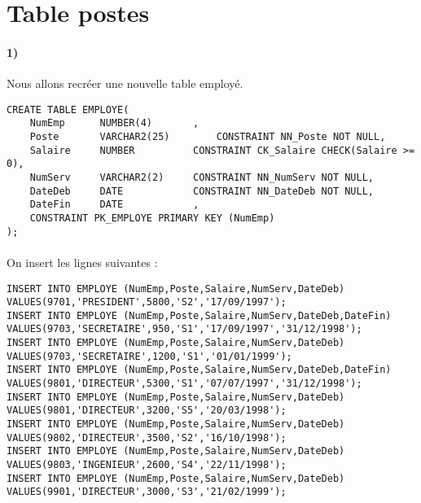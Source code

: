 \documentclass{report}
\begin{document}
\section{Table postes}

\paragraph{1)}Nous allons recréer une nouvelle table employé.

\begin{lstlisting}
CREATE TABLE EMPLOYE(
	NumEmp		NUMBER(4)		,
	Poste		VARCHAR2(25)		CONSTRAINT NN_Poste NOT NULL,
	Salaire		NUMBER			CONSTRAINT CK_Salaire CHECK(Salaire >= 0),
	NumServ		VARCHAR2(2)		CONSTRAINT NN_NumServ NOT NULL,
	DateDeb		DATE			CONSTRAINT NN_DateDeb NOT NULL,
	DateFin		DATE			,
	CONSTRAINT PK_EMPLOYE PRIMARY KEY (NumEmp)
);
\end{lstlisting}

\paragraph{}On insert les lignes suivantes :

\begin{lstlisting}
INSERT INTO EMPLOYE (NumEmp,Poste,Salaire,NumServ,DateDeb) VALUES(9701,'PRESIDENT',5800,'S2','17/09/1997');
INSERT INTO EMPLOYE (NumEmp,Poste,Salaire,NumServ,DateDeb,DateFin) VALUES(9703,'SECRETAIRE',950,'S1','17/09/1997','31/12/1998');
INSERT INTO EMPLOYE (NumEmp,Poste,Salaire,NumServ,DateDeb) VALUES(9703,'SECRETAIRE',1200,'S1','01/01/1999');
INSERT INTO EMPLOYE (NumEmp,Poste,Salaire,NumServ,DateDeb,DateFin) VALUES(9801,'DIRECTEUR',5300,'S1','07/07/1997','31/12/1998');
INSERT INTO EMPLOYE (NumEmp,Poste,Salaire,NumServ,DateDeb) VALUES(9801,'DIRECTEUR',3200,'S5','20/03/1998');
INSERT INTO EMPLOYE (NumEmp,Poste,Salaire,NumServ,DateDeb) VALUES(9802,'DIRECTEUR',3500,'S2','16/10/1998');
INSERT INTO EMPLOYE (NumEmp,Poste,Salaire,NumServ,DateDeb) VALUES(9803,'INGENIEUR',2600,'S4','22/11/1998');
INSERT INTO EMPLOYE (NumEmp,Poste,Salaire,NumServ,DateDeb) VALUES(9901,'DIRECTEUR',3000,'S3','21/02/1999');
\end{lstlisting}
\end{document}
